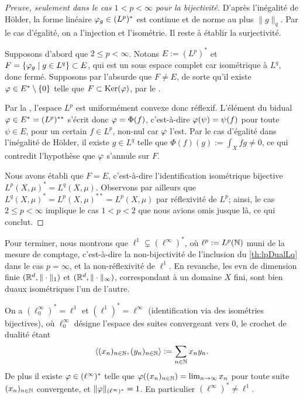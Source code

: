 \begin{proof}[Preuve, seulement dans le cas $1 < p < \infty$ pour la bijectivité]
D'après l'inégalité de Hölder, 
la for\-me linéaire $\varphi_g \in (L^p)^*$ est continue et de norme au plus $\|g\|_q$. Par le cas d'égalité, on a l'injection et l'isométrie. Il reste à établir la surjectivité.

Supposons d'abord que $2 \leq p < \infty$. Notons $E := (L^p)^*$ et $F = \{\varphi_g \mid g \in L^q\} \subset E$, qui est un sous espace complet car isométrique à $L^q$, donc fermé. 
Supposons par l'absurde que $F \neq E$, de sorte qu'il existe $\varphi \in E^*\setminus \{0\}$ telle que $F \subset \operatorname{Ker}(\varphi)$, par le .

Par la , l'espace $L^p$ est uniformément convexe donc réflexif. L'élément du bidual $\varphi \in E^* = (L^p)^{**}$ s'écrit donc $\varphi = \Phi(f)$, c'est-à-dire $\varphi(\psi) =  \psi(f)$ pour toute $\psi \in E$, pour un certain $f \in L^p$, non-nul car $\varphi$ l'est. Par le cas d'égalité dans l'inégalité de Hölder, il existe $g \in L^q$ telle que $\Phi(f)(g) := \int_X f g \neq 0$, ce qui contredit l'hypothèse que $\varphi$ s'annule sur $F$. 

Nous avons établi que $F=E$, c'est-à-dire l'identification isométrique bijective $L^p(X,\mu)^* = L^q (X,\mu)$. 
Observons par ailleurs que $L^q(X,\mu)^* = L^p(X,\mu)^{**} = L^p(X,\mu)$ par réflexivité de $L^p$; ainsi, le cas $2\leq p <\infty$ implique le cas $1<p<2$ que nous avions omis jusque là, ce qui conclut.
\end{proof}

Pour terminer, nous montrons que $\ell^1\subsetneq (\ell^\infty)^*$, où $\ell^p := L^p(\mathbb{N})$ muni de la mesure de comptage, c'est-à-dire la non-bijectivité de l'inclusion du \cref{th:lpDualLq} dans le cas $p=\infty$, et la non-réflexivité de $\ell^1$. En revanche, les evn de dimension finie $(\mathbb{R}^d,\|\cdot\|_1)$ et $(\mathbb{R}^d,\|\cdot\|_\infty)$, correspondant à un domaine $X$ fini, sont bien duaux isométriques l'un de l'autre. 

\begin{exemple}	
\label{ex:nonReflex}
%
On a $(\ell^\infty_0)^* = \ell^1$ et $(\ell^1)^* = \ell^\infty$ (identification via des isométries bijectives), où $\ell^\infty_0$ désigne l'espace des suites convergeant vers $0$, le crochet de dualité étant 
\begin{equation*}
	\langle(x_n)_{n \in \mathbb{N}}, (y_n)_{n\in \mathbb{N}}\rangle := \sum_{n \in \mathbb{N}} x_n y_n.
\end{equation*}
De plus il existe $\varphi \in (\ell^\infty)^*$ telle que $\varphi( (x_n)_{n \in \mathbb{N}} ) = \lim_{n \to \infty} x_n$ pour toute suite $(x_n)_{n\in \mathbb{N}}$ convergente, et $\|\varphi\|_{(\ell^\infty)^*}=1$. En particulier $(\ell^\infty)^* \neq \ell^1$. 
\end{exemple}

